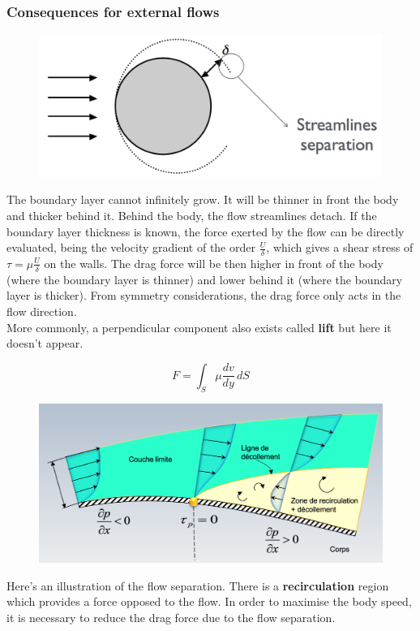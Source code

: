\subsubsection{Consequences for external flows}
	\begin{figure}
	\vspace{-5mm}
	\includegraphics[scale=0.25]{ch1/14}
	\end{figure}	
	The boundary layer cannot infinitely grow. It will be thinner in front the body and thicker behind it. Behind the body, the flow streamlines detach. If the boundary layer thickness is known, the force exerted by the flow can be directly evaluated, being the velocity gradient of the order $\frac{U}{\delta}$, which gives a shear stress of $\tau = \mu\frac{U}{\delta}$ on the walls. The drag force will be then higher in front of the body (where the boundary layer is thinner) and lower behind it (where the boundary layer is thicker). From symmetry considerations, the drag force only acts in the flow direction. \\
	More commonly, a perpendicular component also exists called \textbf{lift} but here it doesn't appear. 
	
	\begin{equation}
		F = \int _S \mu \frac{dv}{dy} \, dS
	\end{equation}
	
	\begin{figure}
	\vspace{-5mm}
	\includegraphics[scale=0.25]{ch1/15}
	\end{figure}
	Here's an illustration of the flow separation. There is a \textbf{recirculation} region which provides a force opposed to the flow. In order to maximise the body speed, it is necessary to reduce the drag force due to the flow separation.  